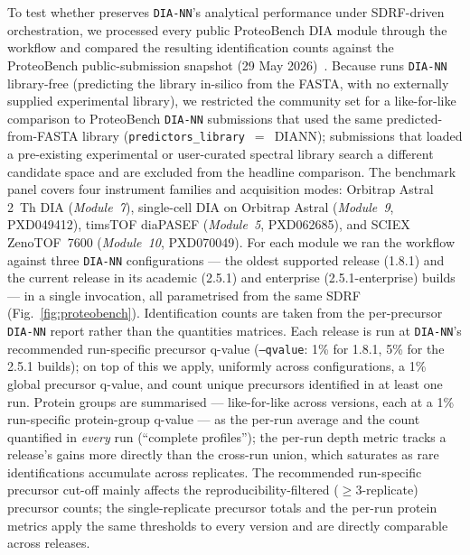 To test whether \quantmsdiann{} preserves \texttt{DIA-NN}'s analytical performance under SDRF-driven orchestration, we processed every public ProteoBench DIA module through the workflow and compared the resulting identification counts against the ProteoBench public-submission snapshot (29 May 2026)~\cite{devreese2025proteobench}.
Because \quantmsdiann{} runs \texttt{DIA-NN} library-free (predicting the library in-silico from the FASTA, with no externally supplied experimental library), we restricted the community set for a like-for-like comparison to ProteoBench \texttt{DIA-NN} submissions that used the same predicted-from-FASTA library (\texttt{predictors\_library}~$=$~DIANN); submissions that loaded a pre-existing experimental or user-curated spectral library search a different candidate space and are excluded from the headline comparison.
The benchmark panel covers four instrument families and acquisition modes: Orbitrap Astral 2~Th DIA (\emph{Module~7}), single-cell DIA on Orbitrap Astral (\emph{Module~9}, PXD049412), timsTOF diaPASEF (\emph{Module~5}, PXD062685), and SCIEX ZenoTOF~7600 (\emph{Module~10}, PXD070049).
For each module we ran the workflow against three \texttt{DIA-NN} configurations --- the oldest supported release (1.8.1) and the current release in its academic (2.5.1) and enterprise (2.5.1-enterprise) builds --- in a single invocation, all parametrised from the same SDRF (Fig.~\ref{fig:proteobench}). Identification counts are taken from the per-precursor \texttt{DIA-NN} report rather than the quantities matrices. Each release is run at \texttt{DIA-NN}'s recommended run-specific precursor q-value (\texttt{--qvalue}: 1\% for 1.8.1, 5\% for the 2.5.1 builds); on top of this we apply, uniformly across configurations, a 1\% global precursor q-value, and count unique precursors identified in at least one run. Protein groups are summarised --- like-for-like across versions, each at a 1\% run-specific protein-group q-value --- as the per-run average and the count quantified in \emph{every} run (``complete profiles''); the per-run depth metric tracks a release's gains more directly than the cross-run union, which saturates as rare identifications accumulate across replicates. The recommended run-specific precursor cut-off mainly affects the reproducibility-filtered ($\geq$3-replicate) precursor counts; the single-replicate precursor totals and the per-run protein metrics apply the same thresholds to every version and are directly comparable across releases.

